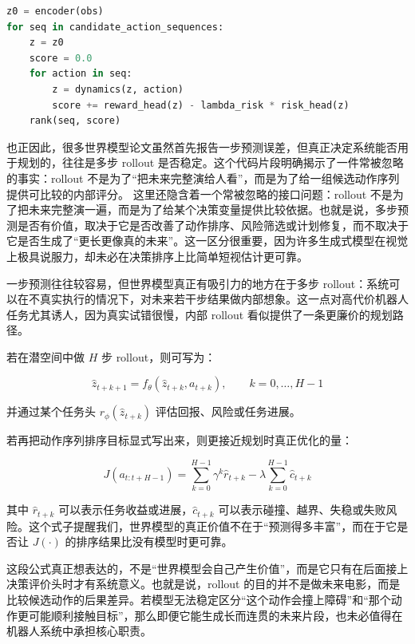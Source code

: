 \begin{lstlisting}[language=python]
z0 = encoder(obs)
for seq in candidate_action_sequences:
    z = z0
    score = 0.0
    for action in seq:
        z = dynamics(z, action)
        score += reward_head(z) - lambda_risk * risk_head(z)
    rank(seq, score)
\end{lstlisting}

也正因此，很多世界模型论文虽然首先报告一步预测误差，但真正决定系统能否用于规划的，往往是多步 rollout 是否稳定。这个代码片段明确揭示了一件常被忽略的事实：rollout 不是为了“把未来完整演给人看”，而是为了给一组候选动作序列提供可比较的内部评分。 这里还隐含着一个常被忽略的接口问题：rollout 不是为了把未来完整演一遍，而是为了给某个决策变量提供比较依据。也就是说，多步预测是否有价值，取决于它是否改善了动作排序、风险筛选或计划修复，而不取决于它是否生成了“更长更像真的未来”。这一区分很重要，因为许多生成式模型在视觉上极具说服力，却未必在决策排序上比简单短视估计更可靠。

一步预测往往较容易，但世界模型真正有吸引力的地方在于多步 rollout：系统可以在不真实执行的情况下，对未来若干步结果做内部想象。这一点对高代价机器人任务尤其诱人，因为真实试错很慢，内部 rollout 看似提供了一条更廉价的规划路径。

若在潜空间中做 \(H\) 步 rollout，则可写为：

\begingroup
\footnotesize
\begin{equation*}
\hat{z}_{t+k+1} = f_\theta(\hat{z}_{t+k}, a_{t+k}), \qquad k=0,\dots,H-1
\end{equation*}
\endgroup

并通过某个任务头 \(r_\phi(\hat{z}_{t+k})\) 评估回报、风险或任务进展。

若再把动作序列排序目标显式写出来，则更接近规划时真正优化的量：

\begingroup
\scriptsize
\begin{equation*}
J(a_{t:t+H-1}) =
\sum_{k=0}^{H-1} \gamma^k \hat{r}_{t+k}
- \lambda \sum_{k=0}^{H-1} \hat{c}_{t+k}
\end{equation*}
\endgroup

其中 \(\hat{r}_{t+k}\) 可以表示任务收益或进展，\(\hat{c}_{t+k}\) 可以表示碰撞、越界、失稳或失败风险。这个式子提醒我们，世界模型的真正价值不在于“预测得多丰富”，而在于它是否让 \(J(\cdot)\) 的排序结果比没有模型时更可靠。

这段公式真正想表达的，不是“世界模型会自己产生价值”，而是它只有在后面接上决策评价头时才有系统意义。也就是说，rollout 的目的并不是做未来电影，而是比较候选动作的后果差异。若模型无法稳定区分“这个动作会撞上障碍”和“那个动作更可能顺利接触目标”，那么即便它能生成长而连贯的未来片段，也未必值得在机器人系统中承担核心职责。

